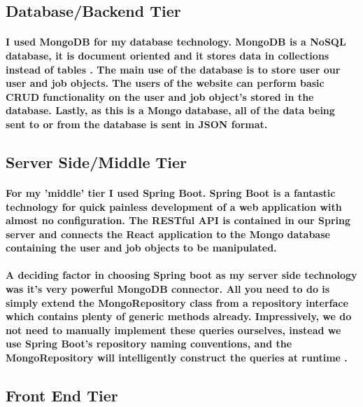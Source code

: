 \subsection{Database/Backend Tier}
\paragraph{I used MongoDB for my database technology. MongoDB is a NoSQL database, it is document oriented and it stores data in collections instead of tables \cite{parker2013comparing}.
The main use of the database is to store user our user and job objects. The users of the website can perform basic CRUD functionality on the user and job object's stored in the database. Lastly, as this is a Mongo database, all of the data being sent to or from the database is sent in JSON format.}

\subsection{Server Side/Middle Tier}
\paragraph{For my 'middle' tier I used Spring Boot. Spring Boot is a fantastic technology for quick painless development of a web application with almost no configuration. The RESTful API is contained in our Spring server and connects the React application to the Mongo database containing the user and job objects to be manipulated.}
\paragraph{A deciding factor in choosing Spring boot as my server side technology was it's very powerful MongoDB connector. All you need to do is simply extend the MongoRepository class from a repository interface which contains plenty of generic methods already. Impressively, we do not need to manually implement these queries ourselves, instead we use Spring Boot's repository naming conventions, and the MongoRepository will intelligently construct the queries at runtime \cite{marchioni2015mongodb}.}

\subsection{Front End Tier}
